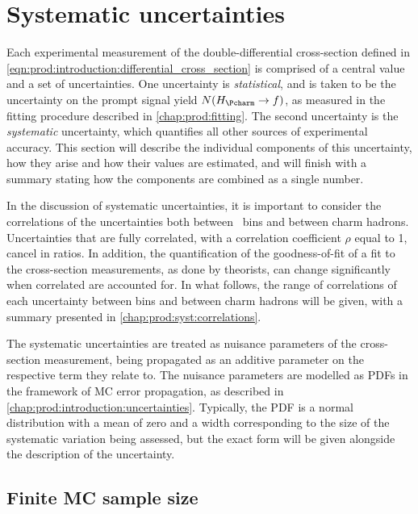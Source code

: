 \chapter{Systematic uncertainties}
\label{chap:prod:syst}

Each experimental measurement of the double-differential cross-section defined 
in \cref{eqn:prod:introduction:differential_cross_section} is comprised of a 
central value and a set of uncertainties.
One uncertainty is \emph{statistical}, and is taken to be the uncertainty on 
the prompt signal yield $N(\HcTof)$, as measured in the fitting procedure 
described in \cref{chap:prod:fitting}.
The second uncertainty is the \emph{systematic} uncertainty, which quantifies 
all other sources of experimental accuracy.
This section will describe the individual components of this uncertainty, how 
they arise and how their values are estimated, and will finish with a summary 
stating how the components are combined as a single number.

In the discussion of systematic uncertainties, it is important to consider the 
correlations of the uncertainties both between \pTy\ bins and between charm 
hadrons.
Uncertainties that are fully correlated, with a correlation coefficient $\rho$ 
equal to 1, cancel in ratios.
In addition, the quantification of the goodness-of-fit of a fit to the 
cross-section measurements, as done by theorists, can change significantly when 
correlated are accounted for.
In what follows, the range of correlations of each uncertainty between bins and 
between charm hadrons will be given, with a summary presented in 
\cref{chap:prod:syst:correlations}.

The systematic uncertainties are treated as nuisance parameters of the 
cross-section measurement, being propagated as an additive parameter on the 
respective term they relate to.
The nuisance parameters are modelled as \aclp{PDF} in the framework of \acl{MC} 
error propagation, as described in \cref{chap:prod:introduction:uncertainties}.
Typically, the \ac{PDF} is a normal distribution with a mean of zero and a 
width corresponding to the size of the systematic variation being assessed, but 
the exact form will be given alongside the description of the uncertainty.

\section{Finite \acl{MC} sample size}
\label{chap:prod::syst:mcstat}

